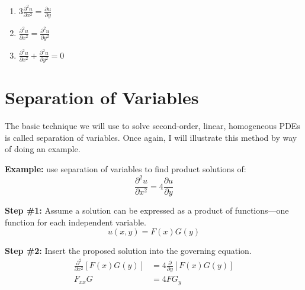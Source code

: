 \begin{enumerate}
\item $3\frac{\partial^2 u}{\partial x^2} = \frac{\partial u}{\partial y} $

\vspace{0.5cm}

\item $\frac{\partial^2 u}{\partial x^2} = \frac{\partial^2 u}{\partial y^2}$

\vspace{0.5cm}

\item $\frac{\partial^2 u}{\partial x^2} + \frac{\partial^2 u}{\partial y^2} = 0$
\end{enumerate}

\section{Separation of Variables}
The basic technique we will use to solve second-order, linear, homogeneous PDEs is called separation of variables.  Once again, I will illustrate this method by way of doing an example.

\vspace{0.25cm}

\noindent\textbf{Example:} use separation of variables to find product solutions of:
\begin{equation}
\frac{\partial^2 u}{\partial x^2} = 4\frac{\partial u}{\partial y}
\label{eq:lec21-ex}
\end{equation}

\noindent\textbf{Step \#1:} Assume a solution can be expressed as a product of functions---one function for each independent variable.  
\begin{equation*}
u(x,y) = F(x)G(y)
\end{equation*}

\vspace{0.5cm}

\noindent\textbf{Step \#2:} Insert the proposed solution into the governing equation.
\begin{align*}
\frac{\partial^2}{\partial x^2}\left[F(x)G(y)\right] &= 4 \frac{\partial}{\partial y}\left[F(x)G(y)\right] \\
F_{xx}G &= 4 FG_{y}
\end{align*}

\vspace{0.5cm}

